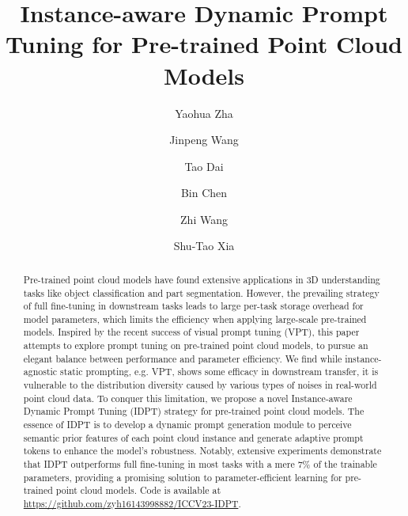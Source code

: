 \documentclass[10pt,twocolumn,letterpaper]{article}
\begin{document}
\title{Instance-aware Dynamic Prompt Tuning for Pre-trained Point Cloud Models}

\author[1 \thanks{These authors contributed equally to this work.}]{
    Yaohua Zha}
\author[1 $^*$]{
    Jinpeng Wang}
\author[2 \thanks{Corresponding author.}]{
    Tao Dai}
\author[3]{
    Bin Chen}
\author[1]{
    Zhi Wang}
\author[1,4]{
    Shu-Tao Xia}

\maketitle
\ifcvffinal\thispagestyle{empty}\fi

\begin{abstract}
Pre-trained point cloud models have found extensive applications in 3D understanding tasks like object classification and part segmentation. 
However, the prevailing strategy of full fine-tuning in downstream tasks leads to large per-task storage overhead for model parameters, which limits the efficiency when applying large-scale pre-trained models. 
Inspired by the recent success of visual prompt tuning (VPT), this paper attempts to explore prompt tuning on pre-trained point cloud models, to pursue an elegant balance between performance and parameter efficiency. 
We find while instance-agnostic static prompting, e.g. VPT, shows some efficacy in downstream transfer, it is vulnerable to the distribution diversity caused by various types of noises in real-world point cloud data. 
To conquer this limitation, we propose a novel Instance-aware Dynamic Prompt Tuning (IDPT) strategy for pre-trained point cloud models. 
The essence of IDPT is to develop a dynamic prompt generation module to perceive semantic prior features of each point cloud instance and generate adaptive prompt tokens to enhance the model's robustness. 
Notably, extensive experiments demonstrate that IDPT outperforms full fine-tuning in most tasks with a mere 7\% of the trainable parameters, providing a promising solution to parameter-efficient learning for pre-trained point cloud models. 
Code is available at \url{https://github.com/zyh16143998882/ICCV23-IDPT}. 

\end{abstract}
\end{document}
